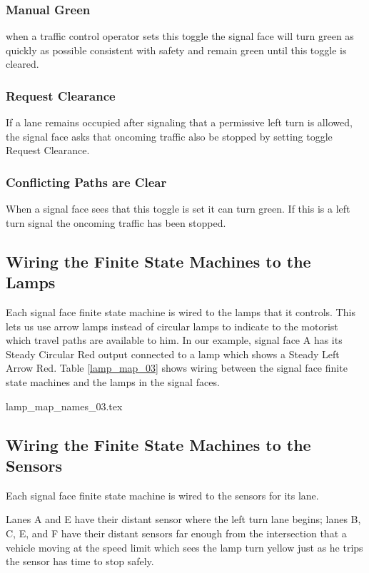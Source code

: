 \documentclass[letterpaper,twoside]{article}
\begin{document}
\subsubsection{Manual Green}
when a traffic control operator sets this toggle the signal face will
turn green as quickly as possible consistent with safety and remain
green until this toggle is cleared.

\subsubsection{Request Clearance}
If a lane remains occupied after signaling that a permissive left
turn is allowed, the signal face asks that oncoming traffic also
be stopped by setting toggle Request Clearance.

\subsubsection{Conflicting Paths are Clear}
When a signal face sees that this toggle is set it can turn green.
If this is a left turn signal the oncoming traffic has been stopped.

\subsection{Wiring the Finite State Machines to the Lamps}

Each signal face finite state machine is wired to the lamps that
it controls.  This lets us use arrow lamps instead of circular lamps
to indicate to the motorist which travel paths are available to him.
In our example, signal face A has its Steady Circular Red output
connected to a lamp which shows a Steady Left Arrow Red.
Table \ref{lamp_map_03} shows wiring between the signal face finite state
machines and the lamps in the signal faces.

 {lamp_map_names_03.tex}

\subsection{Wiring the Finite State Machines to the Sensors}

Each signal face finite state machine is wired to the sensors
for its lane.

Lanes A and E have their distant sensor where
the left turn lane begins; lanes B, C, E, and F have their
distant sensors far enough from the intersection that a vehicle
moving at the speed limit which sees the lamp turn yellow
just as he trips the sensor has time to stop safely.
\end{document}
